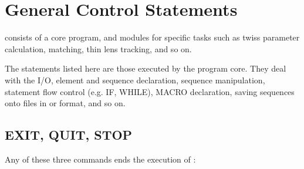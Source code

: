 

%
%
%
%


\chapter{General Control Statements} 

\madx consists of a core program, and modules for specific tasks such as
twiss parameter calculation, matching, thin lens tracking, and so on.  
 
The statements listed here are those executed by the program core. They
deal with the I/O, element and sequence declaration, sequence
manipulation, statement flow control (e.g. IF, WHILE), MACRO
declaration, saving sequences onto files in \madx or \madeight format,
and so on.  








\section{EXIT, QUIT, STOP}
\label{sec:exit}\label{sec:quit}\label{sec:stop}
Any of these three commands ends the execution of \madx:


